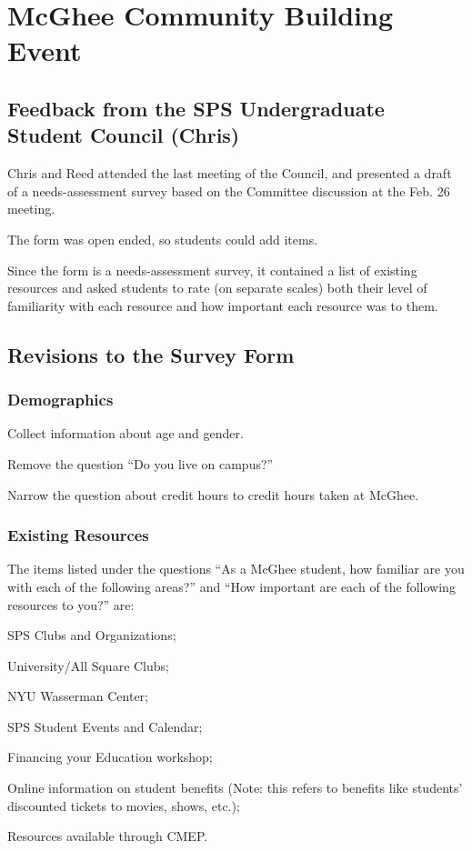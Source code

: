 \documentclass[10pt]{meetingmins}
\begin{document}
\maketitle

\section{McGhee Community Building Event}
\subsection{Feedback from the SPS Undergraduate Student Council (Chris)}
\begin{subitems}
	\item Chris and Reed attended the last meeting of the Council, and presented a draft of a needs-assessment survey based on the Committee discussion at the Feb. 26 meeting.
	\item The form was open ended, so students could add  items.
	\item Since the form is a needs-assessment survey, it contained a list of existing resources and asked students to rate (on separate scales) both their level of familiarity with each resource and how important each resource was to them.
	\end{subitems}
\subsection{Revisions to the Survey Form} 
\subsubsection{Demographics}
\begin{subsubitems}
\item Collect information about age and gender.
\item Remove the question ``Do you live on campus?''
\item Narrow the question about credit hours to credit hours taken at McGhee. 
\end{subsubitems}
\subsubsection{Existing Resources} The items listed under the questions ``As a McGhee student, how familiar are you with each of the following areas?'' and ``How important are each of the following resources to you?'' are:
\begin{subsubitems}
\item SPS Clubs and Organizations;
\item University/All Square Clubs;
\item NYU Wasserman Center;
\item SPS Student Events and Calendar;
\item Financing your Education workshop;
\item Online information on student benefits (Note: this refers to benefits like students' discounted tickets to movies, shows, etc.);
\item Resources available through CMEP.
\end{subsubitems} 
\end{document}
